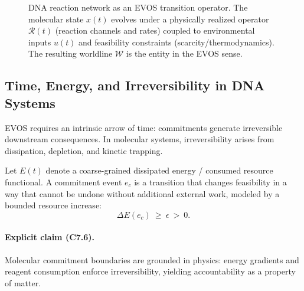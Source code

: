 \documentclass[11pt]{article}
\begin{document}
\begin{figure}[t]
\caption{DNA reaction network as an EVOS transition operator. The molecular state $x(t)$ evolves under a physically realized operator $\mathcal{R}(t)$ (reaction channels and rates) coupled to environmental inputs $u(t)$ and feasibility constraints (scarcity/thermodynamics). The resulting worldline $\mathcal{W}$ is the entity in the EVOS sense.}
\label{fig:dna-operator-evos}
\end{figure}

\subsection{Time, Energy, and Irreversibility in DNA Systems}
\label{sec:time-energy-irreversibility}

EVOS requires an intrinsic arrow of time: commitments generate irreversible downstream
consequences. In molecular systems, irreversibility arises from dissipation, depletion,
and kinetic trapping.

Let $E(t)$ denote a coarse-grained dissipated energy / consumed resource functional.
A commitment event $e_c$ is a transition that changes feasibility in a way that cannot be
undone without additional external work, modeled by a bounded resource increase:
\[
\Delta E(e_c)\ \ge\ \epsilon\ >\ 0.
\]

\paragraph{Explicit claim (C7.6).}
Molecular commitment boundaries are grounded in physics: energy gradients and reagent
consumption enforce irreversibility, yielding accountability as a property of matter.
\end{document}
